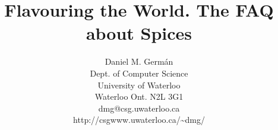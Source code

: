 \batchmode
{}
\makeatletter
\title{Flavouring the World. The FAQ about Spices}

\author{Daniel M. Germ\'{a}n\\ Dept. of Computer Science\\ University of
  Waterloo\\  Waterloo Ont. N2L 3G1\\  
  dmg@csg.uwaterloo.ca\\ http://csgwww.uwaterloo.ca/\~{ }dmg/}


\renewcommand {\topfraction}{0.95}

\renewcommand {\textfraction}{0.02}

\makeatother
\newenvironment{tex2html_wrap}{}{}
\newwrite\lthtmlwrite
\def\lthtmltypeout#1{{\let\protect\string\immediate\write\lthtmlwrite{#1}}}%
\newbox\sizebox

